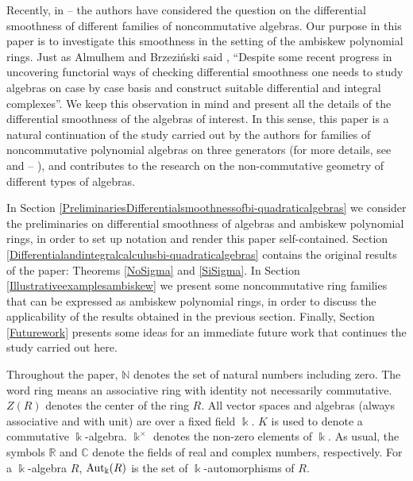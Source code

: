\documentclass{amsart}
\theoremstyle{definition}
\theoremstyle{remark}
\numberwithin{equation}{section}
\begin{document}
Recently, in \cite{Rubiano2026}--\cite{RubianoReyes20263D} the authors have considered the question on the differential smoothness of different families of noncommutative algebras. Our purpose in this paper is to investigate this smoothness in the setting of the ambiskew polynomial rings. Just as Almulhem and Brzezi{\'n}ski said \cite[Section 1]{AlmulhemBrzezinski2019}, \textquotedblleft Despite some recent progress in uncovering functorial ways of checking differential smoothness \cite{BrzezinskiLomp2018} one needs to study algebras on case by case basis and construct suitable differential and integral complexes\textquotedblright. We keep this observation in mind and present all the details of the differential smoothness of the algebras of interest. In this sense, this paper is a natural continuation of the study carried out by the authors for families of noncommutative polynomial algebras on three generators (for more details, see \cite{ReyesSarmiento2022} and \cite{RubianoReyes2024DSBiquadraticAlgebras} -- \cite{RubianoReyes20263D}), and contributes to the research on the non-commutative geometry of different types of algebras. 

 In Section \ref{PreliminariesDifferentialsmoothnessofbi-quadraticalgebras} we consider the preliminaries on differential smoothness of algebras and ambiskew polynomial rings, in order to set up notation and render this paper self-contained. Section \ref{Differentialandintegralcalculusbi-quadraticalgebras} contains the original results of the paper: Theorems \ref{NoSigma} and \ref{SiSigma}. In Section \ref{Illustrativeexamplesambiskew} we present some noncommutative ring families that can be expressed as ambiskew polynomial rings, in order to discuss the applicability of the results obtained in the previous section. Finally, Section \ref{Futurework} presents some ideas for an immediate future work that continues the study carried out here.

Throughout the paper, $\mathbb{N}$ denotes the set of natural numbers including zero. The word ring means an associative ring with identity not necessarily commutative. $Z(R)$ denotes the center of the ring $R$. All vector spaces and algebras (always associative and with unit) are over a fixed field $\Bbbk$. $K$ is used to denote a commutative $\Bbbk$-algebra. $\Bbbk^{\times}$ denotes the non-zero elements of $\Bbbk$. As usual, the symbols $\mathbb{R}$ and $\mathbb{C}$ denote the fields of real and complex numbers, respectively. For a $\Bbbk$-algebra $R$, ${\rm Aut}_{\Bbbk}(R)$ is the set of $\Bbbk$-automorphisms of $R$.
\end{document}
